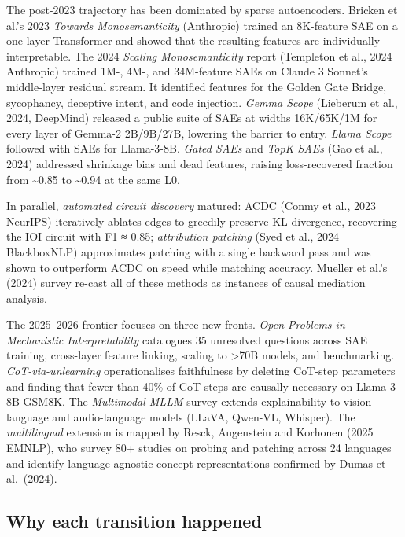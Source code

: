 \documentclass{article}
\begin{document}
The post-2023 trajectory has been dominated by sparse autoencoders. Bricken et al.'s 2023 \emph{Towards Monosemanticity} (Anthropic) trained an 8K-feature SAE on a one-layer Transformer and showed that the resulting features are individually interpretable. The 2024 \emph{Scaling Monosemanticity} report (Templeton et al., 2024 Anthropic) trained 1M-, 4M-, and 34M-feature SAEs on Claude 3 Sonnet's middle-layer residual stream. It identified features for the Golden Gate Bridge, sycophancy, deceptive intent, and code injection. \emph{Gemma Scope} (Lieberum et al., 2024, DeepMind) released a public suite of SAEs at widths 16K/65K/1M for every layer of Gemma-2 2B/9B/27B, lowering the barrier to entry. \emph{Llama Scope} \citep{he2024dictionarylearning} followed with SAEs for Llama-3-8B. \emph{Gated SAEs} \citep{rajamanoharan2024improvingdictionar} and \emph{TopK SAEs} (Gao et al., 2024) addressed shrinkage bias and dead features, raising loss-recovered fraction from \textasciitilde0.85 to \textasciitilde0.94 at the same L0.

In parallel, \emph{automated circuit discovery} matured: ACDC (Conmy et al., 2023 NeurIPS) iteratively ablates edges to greedily preserve KL divergence, recovering the IOI circuit with F1 ≈ 0.85; \emph{attribution patching} (Syed et al., 2024 BlackboxNLP) approximates patching with a single backward pass and was shown to outperform ACDC on speed while matching accuracy. Mueller et al.'s (2024) survey re-cast all of these methods as instances of causal mediation analysis.

The 2025--2026 frontier focuses on three new fronts. \emph{Open Problems in Mechanistic Interpretability} \citep{sharkey2025openproblemsinmech} catalogues 35 unresolved questions across SAE training, cross-layer feature linking, scaling to \textgreater70B models, and benchmarking. \emph{CoT-via-unlearning} \citep{tutek2025measuringchainofth} operationalises faithfulness by deleting CoT-step parameters and finding that fewer than 40\% of CoT steps are causally necessary on Llama-3-8B GSM8K. The \emph{Multimodal MLLM} survey \citep{dang2024explainableandinte} extends explainability to vision-language and audio-language models (LLaVA, Qwen-VL, Whisper). The \emph{multilingual} extension is mapped by Resck, Augenstein and Korhonen (2025 EMNLP), who survey 80+ studies on probing and patching across 24 languages and identify language-agnostic concept representations confirmed by Dumas et al.~(2024).

\subsection{Why each transition happened}\label{why-each-transition-happened}
\end{document}
